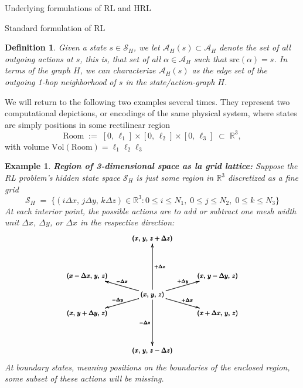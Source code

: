 \documentclass[11pt]{article}
\newtheorem{definition}[subsubsection]{Definition}
\newtheorem{example}[subsubsection]{Example}
\begin{document}
\begin{section}{Underlying formulations of RL and HRL}
\begin{subsection}{Standard formulation of RL}
\begin{definition}
Given a state $s\in\mathcal{S}_{H}$, we let $\mathcal{A}_{H}(s)\subset \mathcal{A}_{H}$ denote the set of all outgoing actions at $s$, this is, that set of all $\alpha\in\mathcal{A}_{H}$ such that
$\text{src}(\alpha)=s$. In terms of the graph $H$, we can characterize $\mathcal{A}_{H}(s)$ as the edge set of the outgoing 1-hop neighborhood of $s$ in the state/action-graph $H$.
\end{definition}

\noindent
We will return to the following two examples several times. They represent two computational depictions, or encodings of the same physical system, where states are simply positions in some rectilinear region
$$
\text{Room}
\;:=\;
[0,\,\ell_1]\times[0,\,\ell_2]\times[0,\,\ell_3]\;\subset\;\mathbb{R}^{3},
$$
with volume $\text{Vol}(\text{Room})=\ell_{1}\ell_{2}\ell_{3}$

\begin{example}\label{ex: actions match projections}
{\bf Region of 3-dimensional space as la grid lattice:}
\normalfont
Suppose the RL problem's hidden state space $\mathcal{S}_{H}$ is just some region in $\mathbb{R}^{3}$ discretized as a fine grid
$$
\mathcal{S}_{H}
\;=\;
\Big\{(i\Delta x,\,j\Delta y,\,k\Delta z)\in\mathbb{R}^{3}:
0\le i\le N_1,\;
0\le j\le N_2,\;
0\le k\le N_3
\Big\}
$$
At each interior point, the possible actions are to add or subtract one mesh width unit $\Delta x$, $\Delta y$, or $\Delta x$ in the respective direction:
$$
\scalebox{.8}{$
\pmb{
\begin{xy}
(0,0)*+{(x,\,y,\,z)}="000";
(35,-10)*+{(x+\Delta x,\,y,\,z)}="100";
(-35,10)*+{(x-\Delta x,\,y,\,z)}="-100";
(35,10)*+{(x,\,y-\Delta y,\,z)}="010";
(-35,-10)*+{(x,\,y+\Delta y,\,z)}="0-10";
(0,30)*+{(x,\,y,\,z+\Delta z)}="001";
(0,-30)*+{(x,\,y,\,z-\Delta z)}="00-1";
{\ar^{+\Delta x} "000"; "100"};
{\ar^{+\Delta y} "000"; "010"};
{\ar_{+\Delta z} "000"; "001"};
{\ar_{-\Delta x} "000"; "-100"};
{\ar_{-\Delta y} "000"; "0-10"};
{\ar_{-\Delta z} "000"; "00-1"};
\end{xy}
}
$}
$$
At boundary states, meaning positions on the boundaries of the enclosed region, some subset of these actions will be missing.


\end{example}
\end{subsection}
\end{section}
\end{document}
